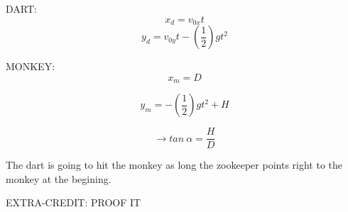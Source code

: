 \documentclass[]{beamer}
\begin{document}


\begin{frame}

  
DART:
    \begin{equation*}
       x_d=v_{0x}t
       \end{equation*}     
       \begin{equation*}
        y_d=v_{0y}t-(\frac{1}{2})gt^2
        \end{equation*}    

        \vspace{5mm}
        MONKEY:   
    \begin{equation*}
        x_m=D
        \end{equation*}  

        \begin{equation*}
         y_m=-(\frac{1}{2})gt^2+H
         \end{equation*}    

      \end{frame}
      


\begin{frame}

  
        \begin{equation*}
         \rightarrow tan\  \alpha=\frac{H}{D}
        \end{equation*}     
    
        
          \pause

          \vspace{5mm}

The dart is going to hit the monkey as long the  zookeeper points right to the monkey at the begining.

\pause
\vspace{5mm}

EXTRA-CREDIT: PROOF IT


\end{frame}
\end{document}

